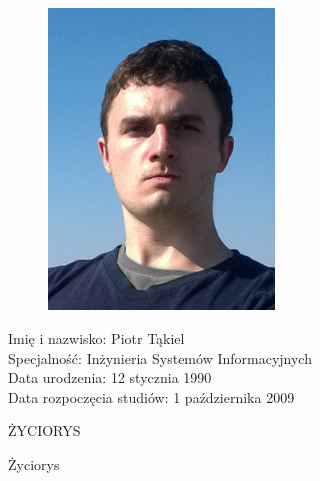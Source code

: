 \documentclass[../thesis.tex]{subfiles}
\begin{document}
{
\begin{figure}
\begin{center}
\includegraphics[width=6cm]{foto.jpg}
\end{center}
\end{figure}

\setlength{\parindent}{0pt}

Imię i nazwisko: Piotr Tąkiel\\
Specjalność: Inżynieria Systemów Informacyjnych\\
Data urodzenia: 12 stycznia 1990\\
Data rozpoczęcia studiów: 1 października 2009\\

\vspace{4cm}
\begin{center}
\huge ŻYCIORYS
\end{center}

\vspace{2cm}
Życiorys

}
\newpage
\end{document}
